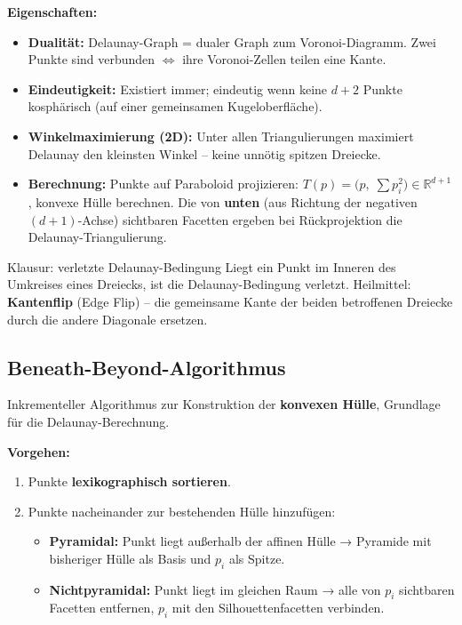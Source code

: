\documentclass[12pt, a4paper]{article}
\begin{document}
\textbf{Eigenschaften:}
\begin{itemize}
  \item \textbf{Dualität:} Delaunay-Graph = dualer Graph zum Voronoi-Diagramm. Zwei Punkte sind verbunden $\Leftrightarrow$ ihre Voronoi-Zellen teilen eine Kante.
  \item \textbf{Eindeutigkeit:} Existiert immer; eindeutig wenn keine $d+2$ Punkte kosphärisch (auf einer gemeinsamen Kugeloberfläche).
  \item \textbf{Winkelmaximierung (2D):} Unter allen Triangulierungen maximiert Delaunay den kleinsten Winkel -- keine unnötig spitzen Dreiecke.
  \item \textbf{Berechnung:} Punkte auf Paraboloid projizieren: $T(p) = \bigl(p,\; \textstyle\sum p_i^2\bigr) \in \mathbb{R}^{d+1}$, konvexe Hülle berechnen. Die von \textbf{unten} (aus Richtung der negativen $(d{+}1)$-Achse) sichtbaren Facetten ergeben bei Rückprojektion die Delaunay-Triangulierung.
\end{itemize}

\begin{notebox}{Klausur: verletzte Delaunay-Bedingung}
Liegt ein Punkt im Inneren des Umkreises eines Dreiecks, ist die Delaunay-Bedingung verletzt. Heilmittel: \textbf{Kantenflip} (Edge Flip) -- die gemeinsame Kante der beiden betroffenen Dreiecke durch die andere Diagonale ersetzen.
\end{notebox}

\subsection{Beneath-Beyond-Algorithmus}

Inkrementeller Algorithmus zur Konstruktion der \textbf{konvexen Hülle}, Grundlage für die Delaunay-Berechnung.

\textbf{Vorgehen:}
\begin{enumerate}
  \item Punkte \textbf{lexikographisch sortieren}.
  \item Punkte nacheinander zur bestehenden Hülle hinzufügen:
  \begin{itemize}
    \item \textbf{Pyramidal:} Punkt liegt außerhalb der affinen Hülle → Pyramide mit bisheriger Hülle als Basis und $p_i$ als Spitze.
    \item \textbf{Nichtpyramidal:} Punkt liegt im gleichen Raum → alle von $p_i$ sichtbaren Facetten entfernen, $p_i$ mit den Silhouettenfacetten verbinden.
  \end{itemize}
\end{enumerate}
\end{document}
